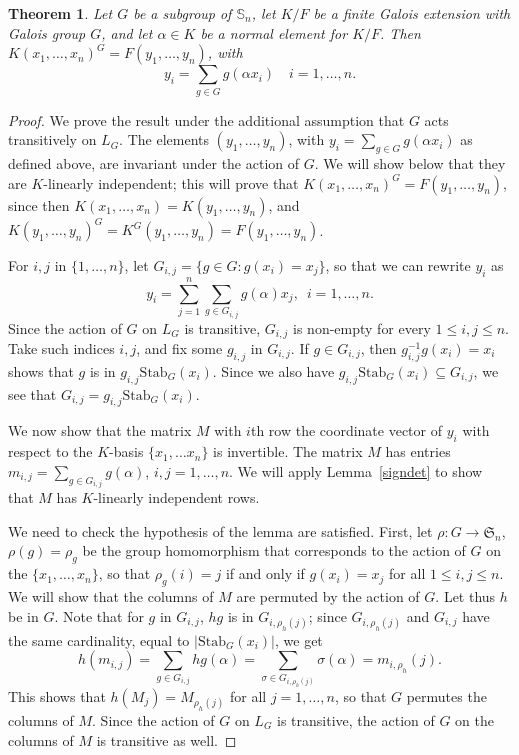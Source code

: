 \documentclass[12pt]{article}
\theoremstyle{plain}
\newtheorem{theorem}{Theorem}
\begin{document}
\begin{theorem}
  Let $G$ be a subgroup of $\mathbb{S}_n$, let $K/F$ be a finite
  Galois extension with Galois group $G$, and let $\alpha \in K$ be a
  normal element for $K/F$. Then $ K(x_1,\ldots ,
  x_n)^G=F(y_1,\dots,y_n)$, with
  $$y_i =\sum_{g \in G} g(\alpha x_i) \quad i =
  1,\dots,n.$$
\end{theorem}
\begin{proof}
  We prove the result under the additional assumption that $G$ acts
  transitively on $L_G$.  The elements $(y_1,\dots,y_n)$, with $y_i =
  \sum_{g \in G} g(\alpha x_i)$ as defined above, are invariant under
  the action of $G$. We will show below that they are $K$-linearly
  independent; this will prove that
  $K(x_1,\dots,x_n)^G=F(y_1,\dots,y_n)$, since then
  $K(x_1,\dots,x_n)=K(y_1,\dots,y_n)$, and
  $K(y_1,\dots,y_n)^G=K^G(y_1,\dots,y_n)=F(y_1,\dots,y_n)$.

  For $i,j$ in $\{1,\dots,n\}$, let $G_{i,j}= \lbrace g \in G: g(x_i)
  = x_j \rbrace$, so that we can rewrite $y_i$ as $$y_i = \sum^n_{j
    =1}\sum_{g \in G_{i,j}}g(\alpha)x_j, \,\,\, i = 1, \ldots, n.$$
  Since the action of $G$ on $L_G$ is transitive, $G_{i,j}$ is
  non-empty for every $1 \leq i,j \leq n$.  Take such indices $i,j$,
  and fix some $g_{i,j}$ in $G_{i,j}$. If $g \in G_{i,j}$, then
  $g^{-1}_{i,j}g(x_i) = x_i$ shows that $g$ is in
  $g_{i,j}\mathrm{Stab}_G(x_i)$. Since we also have
  $g_{i,j}\mathrm{Stab}_G(x_i) \subseteq G_{i,j}$, we see that
  $G_{i,j} = g_{i,j}\mathrm{Stab}_G(x_i)$.


  We now show that the matrix $M$ with $i$th row the coordinate vector
  of $y_i$ with respect to the $K$-basis $\lbrace x_1, \ldots x_n
  \rbrace$ is invertible. The matrix $M$ has entries $m_{i,j} =
  \sum_{g \in G_{i,j}}g(\alpha)$, $i,j = 1, \ldots, n$. We will apply
  Lemma~\ref{signdet} to show that $M$ has $K$-linearly independent
  rows.

  We need to check the hypothesis of the lemma are satisfied. First,
  let $\rho: G \longrightarrow \mathfrak{S}_n$, $\rho(g) = \rho_g$ be
  the group homomorphism that corresponds to the action of $G$ on the
  $\lbrace x_1, \ldots , x_n \rbrace$, so that $\rho_g(i) = j$ if and
  only if $g(x_i) = x_j$ for all $1 \leq i,j\leq n$. We will show that
  the columns of $M$ are permuted by the action of $G$. Let thus $h$ be in
  $G$. Note that for $g$ in $G_{i,j}$, $hg$ is in $G_{i,\rho_h(j)}$;
  since  $G_{i,\rho_h(j)}$ and $G_{i,j}$ have the same cardinality,
  equal to $|\mathrm{Stab}_G(x_i)|$, we get
  $$h(m_{i,j}) = \sum_{g \in G_{i,j}}hg(\alpha) = \sum_{\sigma \in
    G_{i, \rho_{h}(j)}}\sigma (\alpha) = m_{i,\rho_{h}}(j).$$ This
  shows that $h(M_j) = M_{\rho_h(j)}$ for all $j = 1, \ldots, n$, so
  that $G$ permutes the columns of $M$. Since the action 
  of $G$ on $L_G$ is transitive, the action of $G$ on the columns 
  of $M$ is transitive as well.
  

\end{proof}
\end{document}
